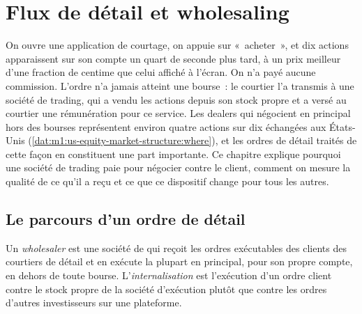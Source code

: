 \chapter{Flux de détail et wholesaling}\label{ch:m1:retail-flow-and-wholesaling}

On ouvre une application de courtage, on appuie sur «~acheter~», et dix actions apparaissent
sur son compte un quart de seconde plus tard, à un prix meilleur d'une fraction de centime
que celui affiché à l'écran. On n'a payé aucune commission. L'ordre n'a jamais atteint
une bourse~: le courtier l'a transmis à une société de trading, qui a vendu les actions
depuis son stock propre et a versé au courtier une rémunération pour ce service. Les dealers
qui négocient en principal hors des bourses représentent environ quatre actions sur dix
échangées aux États-Unis
(\cref{dat:m1:us-equity-market-structure:where}), et les ordres de détail traités de cette façon
en constituent une part importante. Ce chapitre explique pourquoi une société de trading
paie pour négocier contre le client, comment on mesure la qualité de ce qu'il a reçu
et ce que ce dispositif change pour tous les autres.

\section{Le parcours d'un ordre de détail}

\begin{definition}\label{def:m1:retail-flow-and-wholesaling:wholesaler}
Un \emph{wholesaler} est une société de  qui reçoit
les ordres exécutables des clients des courtiers de détail et en exécute la plupart
en principal, pour son propre compte, en dehors de toute bourse.
L'\emph{internalisation} est l'exécution d'un ordre client
contre le stock propre de la société d'exécution plutôt que contre les ordres
d'autres investisseurs sur une plateforme.
\end{definition}

